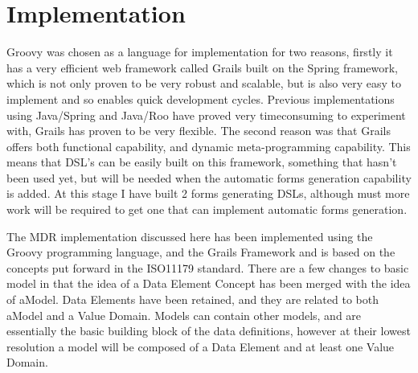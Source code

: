 \section{Implementation}

Groovy was chosen as a language for implementation for two reasons, firstly
it has a very efficient web framework called Grails built on the Spring framework,
which is not only proven to be very robust and scalable, but is also
very easy to implement and so enables quick development cycles. Previous
implementations using Java/Spring and Java/Roo have proved very timeconsuming
to experiment with, Grails has proven to be very flexible. The
second reason was that Grails offers both functional capability, and dynamic
meta-programming capability. This means that DSL’s can be easily built on
this framework, something that hasn’t been used yet, but will be needed when
the automatic forms generation capability is added. At this stage I have built 2
forms generating DSLs, although must more work will be required to get one
that can implement automatic forms generation.
 
The MDR implementation discussed here has been implemented using the
Groovy programming language, and the Grails Framework and is based on
the concepts put forward in the ISO11179 standard. There are a few changes
to basic model in that the idea of a Data Element Concept has been merged
with the idea of aModel. Data Elements have been retained, and they are related
to both aModel and a Value Domain. Models can contain other models,
and are essentially the basic building block of the data definitions, however
at their lowest resolution a model will be composed of a Data Element and at
least one Value Domain.
 